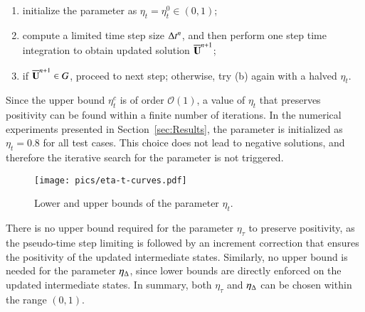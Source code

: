 \begin{enumerate} [label=(\alph*)]
    \item initialize the parameter as $\eta_t= \eta^0_t \in \left(0,1\right)$;
    \item compute a limited time step size $\mathrm\Delta t^n$, and then perform one step time integration to obtain updated solution $\overline{\mathbf{U}}^{n+1}$;
    \item if $\overline{\mathbf{U}}^{n+1} \in G$, proceed to next step; otherwise, try (b) again with a halved $\eta_t$.
\end{enumerate}
Since the upper bound $\eta^c_t$ is of order $\mathcal{O}(1)$, a value of $\eta_t$ that preserves positivity can be found within a finite number of iterations. 
In the numerical experiments presented in Section~\ref{sec:Results}, the parameter is initialized as $\eta_t = 0.8$ for all test cases. This choice does not lead to negative solutions, and therefore the iterative search for the parameter is not triggered.

\begin{figure}[htbp!]
    \centering
    \texttt{[image: pics/eta-t-curves.pdf]}
    \caption{Lower and upper bounds of the parameter $\eta_t$.}
    \label{fig:eta-t-curves}
\end{figure}

There is no upper bound required for the parameter $\eta_\tau$ to preserve positivity, as the pseudo-time step limiting is followed by an increment correction that ensures the positivity of the updated intermediate states. Similarly, no upper bound is needed for the parameter $\eta_{\mathrm\Delta}$, since lower bounds are directly enforced on the updated intermediate states. In summary, both $\eta_\tau$ and $\eta_{\mathrm\Delta}$ can be chosen within the range $(0,1)$.

